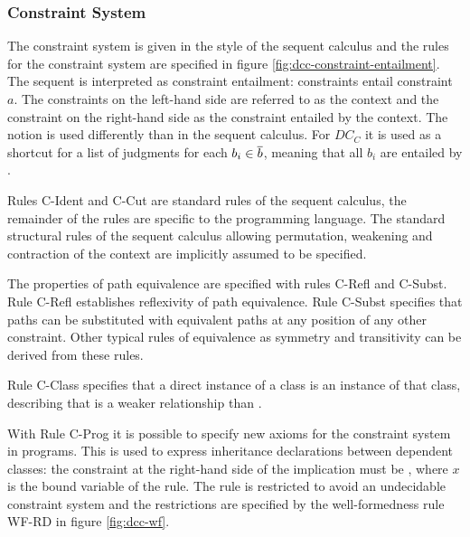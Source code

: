 \subsubsection{Constraint System}
The constraint system is given in the style of the sequent calculus
and the rules for the constraint system are specified in figure \ref{fig:dcc-constraint-entailment}.
The sequent  is interpreted as constraint entailment:
constraints  entail constraint $a$.
The constraints on the left-hand side are referred to as the context
and the constraint on the right-hand side as the constraint entailed by the context.
The notion  is used differently than in the sequent calculus.
For $DC_C$ it is used as a shortcut for a list of judgments
 for each $b_i \in \overline{b}$,
meaning that all $b_i$ are entailed by .

Rules C-Ident and C-Cut are standard rules of the sequent calculus,
the remainder of the rules are specific to the programming language.
The standard structural rules of the sequent calculus allowing
permutation, weakening and contraction of the context
are implicitly assumed to be specified.

The properties of path equivalence are specified with rules C-Refl and C-Subst.
Rule C-Refl establishes reflexivity of path equivalence.
Rule C-Subst specifies that paths can be substituted with equivalent paths
at any position of any other constraint.
Other typical rules of equivalence as symmetry and transitivity can be
derived from these rules.

Rule C-Class specifies that a direct instance of a class
is an instance of that class, describing that
 is a weaker relationship than .

With Rule C-Prog it is possible to specify new axioms for the constraint system in programs.
This is used to express inheritance declarations between dependent classes:
the constraint at the right-hand side of the implication must be ,
where $x$ is the bound variable of the rule.
The rule is restricted to avoid an undecidable constraint system
and the restrictions are specified by the well-formedness rule WF-RD in figure \ref{fig:dcc-wf}.

